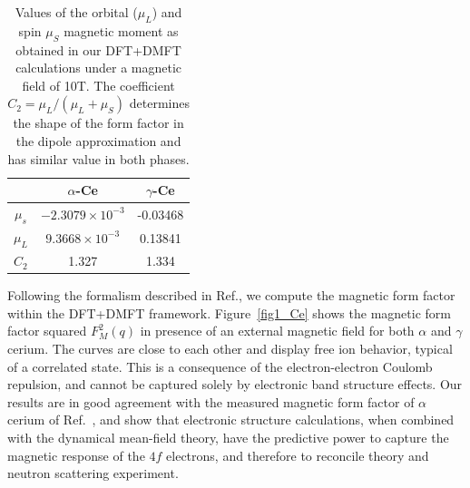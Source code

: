 \documentclass[10pt]{ruthesis}
\begin{document}
{%
\begin{table}[!t]
\begin{tabular}{c|c|c}
 & $\alpha$-Ce & $\gamma$-Ce \\
 \hline
$\mu_s$ & $-2.3079\times10^{-3}$ & -0.03468 \\
$\mu_L$ & $9.3668\times10^{-3}$ & 0.13841\\
$C_2$ & 1.327 & 1.334 \\
\hline
\end{tabular}
\caption{
Values of the orbital ($\mu_L$) and spin $\mu_S$ magnetic moment as
obtained in our DFT+DMFT calculations under a magnetic field of 10T. The coefficient
$C_2=\mu_L/(\mu_L + \mu_S)$ determines the shape of the form factor in
the dipole approximation and has similar value in both phases.
%
}
\label{table1_Ce}
\end{table}
%

Following the formalism described in Ref.\cite{mariettaMFF}, we
compute the magnetic form factor within the DFT+DMFT framework.
Figure~\ref{fig1_Ce} shows the magnetic form factor squared $F_M^{2}(q)$
in presence of an external magnetic field for both $\alpha$ and
$\gamma$ cerium.  The curves are close to each other and display free
ion behavior, typical of a correlated state. This is a consequence of
the electron-electron Coulomb repulsion, and cannot be captured solely
by electronic band structure effects. Our results are in good
agreement with the measured magnetic form factor of $\alpha$ cerium of
Ref.~\cite{murani}, and show that electronic structure calculations,
when combined with the dynamical mean-field theory, have the
predictive power to capture the magnetic response of the $4f$
electrons, and therefore to reconcile theory and neutron scattering
experiment.

}
\end{document}
